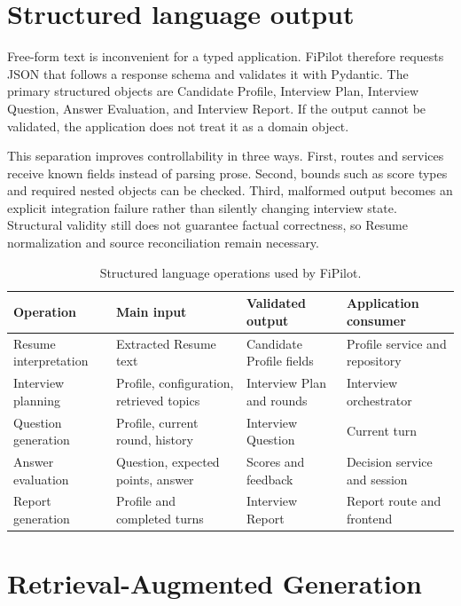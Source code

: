 \section{Structured language output}

Free-form text is inconvenient for a typed application. FiPilot therefore requests JSON that follows a response schema and validates it with Pydantic. The primary structured objects are Candidate Profile, Interview Plan, Interview Question, Answer Evaluation, and Interview Report. If the output cannot be validated, the application does not treat it as a domain object.

This separation improves controllability in three ways. First, routes and services receive known fields instead of parsing prose. Second, bounds such as score types and required nested objects can be checked. Third, malformed output becomes an explicit integration failure rather than silently changing interview state. Structural validity still does not guarantee factual correctness, so Resume normalization and source reconciliation remain necessary.

\begin{table}[htbp]\centering
\caption{Structured language operations used by FiPilot.}\label{tab:structured-operations}
\begin{tabularx}{\textwidth}{p{}p{}YY}\toprule
Operation & Main input & Validated output & Application consumer\\ \midrule
Resume interpretation & Extracted Resume text & Candidate Profile fields & Profile service and repository\\
Interview planning & Profile, configuration, retrieved topics & Interview Plan and rounds & Interview orchestrator\\
Question generation & Profile, current round, history & Interview Question & Current turn\\
Answer evaluation & Question, expected points, answer & Scores and feedback & Decision service and session\\
Report generation & Profile and completed turns & Interview Report & Report route and frontend\\
\bottomrule\end{tabularx}
\end{table}

\section{Retrieval-Augmented Generation}

